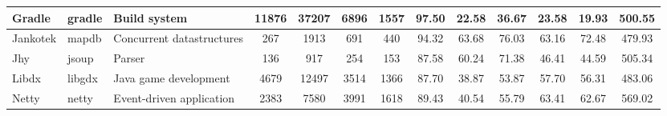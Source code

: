 \begin{table*}[]
{\begin{tabular}{lllcccccccccc}
Gradle                      & gradle                                                        & Build system                                                             & 11876          & 37207           & 6896                                                             & 1557           & 97.50          & 22.58          & 36.67          & 23.58                                                             & 19.93                                                              & 500.55                                               \\ \hline
Jankotek                    & mapdb                                                         & Concurrent datastructures                                                & 267            & 1913            & 691                                                              & 440            & 94.32          & 63.68          & 76.03          & 63.16                                                             & 72.48                                                              & 479.93                                               \\ \hline
Jhy                         & jsoup                                                         & Parser                                                                   & 136            & 917             & 254                                                              & 153            & 87.58          & 60.24          & 71.38          & 46.41                                                             & 44.59                                                              & 505.34                                               \\ \hline
Libdx                       & libgdx                                                        & Java game development                                                    & 4679           & 12497           & 3514                                                             & 1366           & 87.70          & 38.87          & 53.87          & 57.70                                                             & 56.31                                                              & 483.06                                               \\ \hline
Netty                       & netty                                                         & Event-driven application                                                 & 2383           & 7580            & 3991                                                             & 1618           & 89.43          & 40.54          & 55.79          & 63.41                                                             & 62.67                                                              & 569.02                                               \\ \hline

\end{tabular}}
\end{table*}
